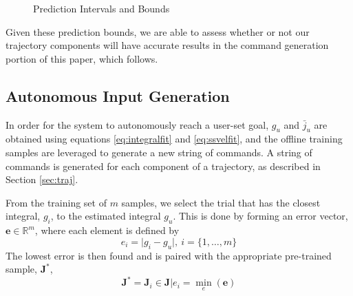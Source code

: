 \documentclass[letterpaper, 10 pt, conference]{ieeeconf}  %
\newcommand{\R}{\mathbb{R}}
\begin{document}
\begin{figure}[ht]
	\centering
	\caption{Prediction Intervals and Bounds}
	\label{fig:bounds}
\end{figure}

Given these prediction bounds, we are able to assess whether or not our trajectory components will have accurate results in the command generation portion of this paper, which follows.

\subsection{Autonomous Input Generation} \label{sec:generate}

In order for the system to autonomously reach a user-set goal, $g_u$ and $\bar{j}_u$ are obtained using equations \eqref{eq:integralfit} and \eqref{eq:ssvelfit}, and the offline training samples are leveraged to generate a new string of commands. A string of commands is generated for each component of a trajectory, as described in Section \ref{sec:traj}.

From the training set of $m$ samples, we select the trial that has the closest integral, $g_i$, to the estimated integral $g_u$. This is done by forming an error vector, $\mathbf{e}\in\R^{m}$, where each element is defined by
\begin{equation}
 e_i = \vert g_i-g_u \vert , ~i= \{1,\ldots,m\}
\end{equation}
 The lowest error is then found and is paired with the appropriate pre-trained sample, $\mathbf{J}^*$,
\begin{equation}
\mathbf{J}^* = \mathbf{J}_i \in \mathbf{J}\vert e_i = \min_e(\mathbf{e})
\end{equation}
\end{document}

